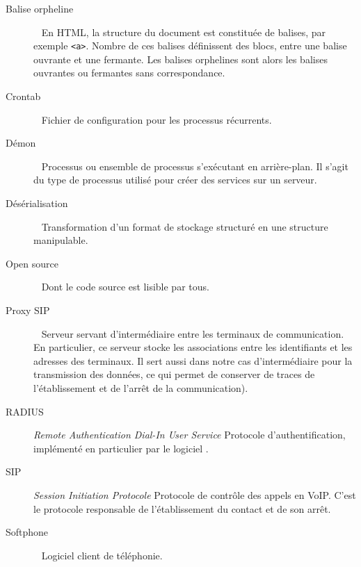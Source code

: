 
\begin{description}
	
	\item[Balise orpheline] ~ \newline En HTML, la structure du document est constituée de balises, par exemple \texttt{<a>}. Nombre de ces balises définissent des blocs, entre une balise ouvrante et une fermante. Les balises orphelines sont alors les balises ouvrantes ou fermantes sans correspondance.

	\item[Crontab] ~ \newline Fichier de configuration pour les processus récurrents.
	
	\item[Démon]  ~ \newline Processus ou ensemble de processus s’exécutant en arrière-plan. Il s’agit du type de processus utilisé pour créer des services sur un serveur.
	
	\item[Désérialisation] ~ \newline Transformation d'un format de stockage structuré en une structure manipulable.
	
	\item[Open source] ~ \newline Dont le code source est lisible par tous.
	
	\item[Proxy SIP] ~ \newline Serveur servant d’intermédiaire entre les terminaux de communication. En particulier, ce serveur stocke les associations entre les identifiants et les adresses des terminaux. Il sert aussi dans notre cas d’intermédiaire pour la transmission des données, ce qui permet de conserver de traces de l’établissement et de l’arrêt de la communication).
	
	\item[RADIUS] \textit{Remote Authentication Dial-In User Service} \newline Protocole d’authentification, implémenté en particulier par le logiciel \frad.
	
	\item[SIP] \textit{Session Initiation Protocole} \newline Protocole de contrôle des appels en VoIP. C’est le protocole responsable de l’établissement du contact et de son arrêt.
	
	\item[Softphone] ~ \newline Logiciel client de téléphonie.
	

\end{description}
